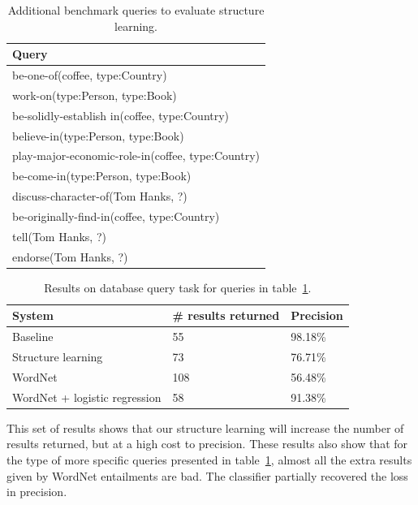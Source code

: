 \documentclass{article}
\begin{document}
\begin{table}[h]
  \caption{Additional benchmark queries to evaluate structure learning.}\label{structure-queries}
  \begin{center}
    \begin{tabular}{l}
      \toprule
      Query\\
      \midrule
      be-one-of(coffee, type:Country)\\
      work-on(type:Person, type:Book)\\
      be-solidly-establish in(coffee, type:Country)\\
      believe-in(type:Person, type:Book)\\
      play-major-economic-role-in(coffee, type:Country)\\
      be-come-in(type:Person, type:Book)\\
      discuss-character-of(Tom Hanks, ?)\\
      be-originally-find-in(coffee, type:Country)\\
      tell(Tom Hanks, ?)\\
      endorse(Tom Hanks, ?)\\
      \bottomrule
    \end{tabular}
  \end{center}
\end{table}

\begin{table}[h]
  \caption{Results on database query task for queries in table~\ref{structure-queries}.}\label{structure-results}
  \begin{center}
    \begin{tabular}{l l l}
      \toprule
      System & \# results returned & Precision\\
      \midrule
      Baseline & 55 & 98.18\%\\
      Structure learning & 73 & 76.71\%\\
      WordNet & 108 & 56.48\% \\
      WordNet + logistic regression & 58 & 91.38\%\\
      \bottomrule
    \end{tabular}
  \end{center}
\end{table}

This set of results shows that our structure learning will increase the number of results returned, but at a high cost to precision. These results also show that for the type of more specific queries presented in table~\ref{structure-queries}, almost all the extra results given by WordNet entailments are bad. The classifier partially recovered the loss in precision.
\end{document}
